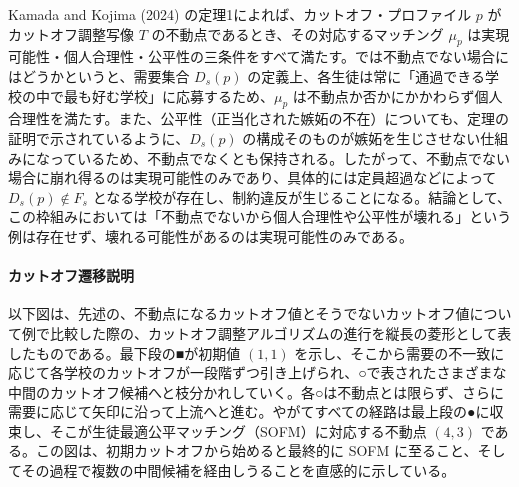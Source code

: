 \documentclass[12pt, a4paper]{article}
\theoremstyle{definition}
\theoremstyle{remark}
\theoremstyle{plain}
\begin{document}
Kamada and Kojima (2024) の定理1によれば、カットオフ・プロファイル $p$ がカットオフ調整写像 $T$ の不動点であるとき、その対応するマッチング $\mu_p$ は実現可能性・個人合理性・公平性の三条件をすべて満たす。では不動点でない場合にはどうかというと、需要集合 $D_s(p)$ の定義上、各生徒は常に「通過できる学校の中で最も好む学校」に応募するため、$\mu_p$ は不動点か否かにかかわらず個人合理性を満たす。また、公平性（正当化された嫉妬の不在）についても、定理の証明で示されているように、$D_s(p)$ の構成そのものが嫉妬を生じさせない仕組みになっているため、不動点でなくとも保持される。したがって、不動点でない場合に崩れ得るのは実現可能性のみであり、具体的には定員超過などによって $D_s(p)\notin F_s$ となる学校が存在し、制約違反が生じることになる。結論として、この枠組みにおいては「不動点でないから個人合理性や公平性が壊れる」という例は存在せず、壊れる可能性があるのは実現可能性のみである。



\bigbreak








\paragraph{カットオフ遷移説明}
以下図は、先述の、不動点になるカットオフ値とそうでないカットオフ値について例で比較した際の、カットオフ調整アルゴリズムの進行を縦長の菱形として表したものである。最下段の■が初期値 $(1,1)$ を示し、そこから需要の不一致に応じて各学校のカットオフが一段階ずつ引き上げられ、○で表されたさまざまな中間のカットオフ候補へと枝分かれしていく。各○は不動点とは限らず、さらに需要に応じて矢印に沿って上流へと進む。やがてすべての経路は最上段の●に収束し、そこが生徒最適公平マッチング（SOFM）に対応する不動点 $(4,3)$ である。この図は、初期カットオフから始めると最終的に SOFM に至ること、そしてその過程で複数の中間候補を経由しうることを直感的に示している。
\end{document}
